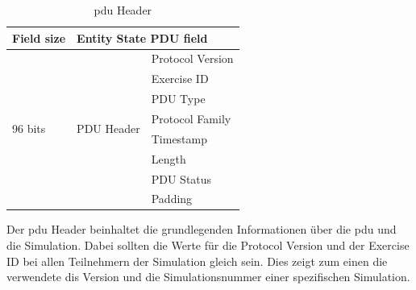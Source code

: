 \begin{table}[H]
	\centering
	\begin{tabular}{|l|c|l|}
		\hline
		\multicolumn{1}{|c|}{Field size} & \multicolumn{2}{l|}{Entity State PDU field}    \\ \hline
		\multirow{8}{*}{96 bits}        & \multirow{8}{*}{PDU Header} & Protocol Version \\ \cline{3-3} 
		&                             & Exercise ID      \\ \cline{3-3} 
		&                             & PDU Type         \\ \cline{3-3} 
		&                             & Protocol Family  \\ \cline{3-3} 
		&                             & Timestamp        \\ \cline{3-3} 
		&                             & Length           \\ \cline{3-3} 
		&                             & PDU Status       \\ \cline{3-3} 
		&                             & Padding          \\ \hline
	\end{tabular}
\caption[\ac{pdu} Header]{\ac{pdu} Header\cite{SISOStandardsActivityCommitteeoftheIEEEComputerSociety.}}
\label{header}
\end{table}
Der \ac{pdu} Header beinhaltet die grundlegenden Informationen über die \ac{pdu} und die Simulation. Dabei sollten die Werte für die \glqq Protocol Version\grqq{} und der \glqq Exercise ID\grqq{} bei allen Teilnehmern der Simulation gleich sein. Dies zeigt zum einen die verwendete \ac{dis} Version und die Simulationsnummer einer spezifischen Simulation.   


